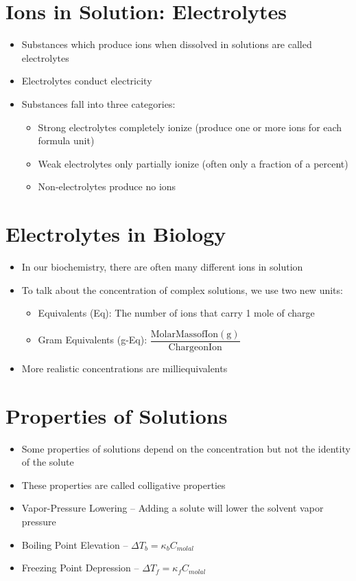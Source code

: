\documentclass[12pt, openany, letterpaper]{memoir}
\begin{document}
\section{Ions in Solution: Electrolytes}
\begin{itemize}
	\item Substances which produce ions when dissolved in solutions are called electrolytes
	\item Electrolytes conduct electricity
	\item Substances fall into three categories:
	      \begin{itemize}
		      \item Strong electrolytes completely ionize (produce one or more ions for each formula unit)
		      \item Weak electrolytes only partially ionize (often only a fraction of a percent)
		      \item Non-electrolytes produce no ions
	      \end{itemize}
\end{itemize}

\section*{Electrolytes in Biology}
\begin{itemize}
	\item In our biochemistry, there are often many different ions in solution
	\item To talk about the concentration of complex solutions, we use two new units:
	      \begin{itemize}
		      \item Equivalents (Eq): The number of ions that carry 1 mole of charge
		      \item Gram Equivalents (g-Eq): $\dfrac{\mathrm{Molar Mass of Ion (g)}}{\mathrm{Charge on Ion}}$
	      \end{itemize}
	\item More realistic concentrations are milliequivalents
\end{itemize}

\section{Properties of Solutions}
\begin{itemize}
	\item Some properties of solutions depend on the concentration but not the identity of the solute
	\item These properties are called colligative properties
	\item Vapor-Pressure Lowering -- Adding a solute will lower the solvent vapor pressure
	\item Boiling Point Elevation -- $\Delta T_b = \kappa_b C_{molal}$
	\item Freezing Point Depression -- $\Delta T_f = \kappa_f C_{molal}$
\end{itemize}
\end{document}
